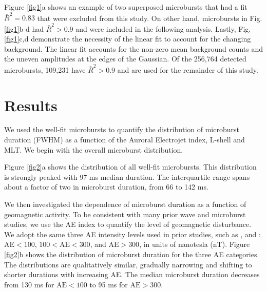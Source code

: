 \documentclass[draft]{agujournal2019}
\begin{document}
Figure \ref{fig1}a shows an example of two superposed microbursts that had a fit $\bar{R}^2 = 0.83$ that were excluded from this study. On other hand, microbursts in Fig. \ref{fig1}b-d had $\bar{R}^2 > 0.9$ and were included in the following analysis. Lastly, Fig. \ref{fig1}c,d demonstrate the necessity of the linear fit to account for the changing background. The linear fit accounts for the non-zero mean background counts and the uneven amplitudes at the edges of the Gaussian. Of the 256,764 detected microbursts, 109,231 have $\bar{R}^2 > 0.9$ and are used for the remainder of this study.

\section{Results}\label{results}
We used the well-fit microbursts to quantify the distribution of microburst duration (FWHM) as a function of the Auroral Electrojet index, L-shell and MLT. We begin with the overall microburst distribution.

Figure \ref{fig2}a shows the distribution of all well-fit microbursts. This distribution is strongly peaked with 97 ms median duration. The interquartile range spans about a factor of two in microburst duration, from 66 to 142 ms.

We then investigated the dependence of microburst duration as a function of geomagnetic activity. To be consistent with many prior wave and microburst studies, we use the AE index to quantify the level of geomagnetic disturbance. We adopt the same three AE intensity levels used in prior studies, such as , and : $\mathrm{AE} < 100$, $100 < \mathrm{AE} < 300$, and $\mathrm{AE} > 300$, in units of nanotesla (nT). Figure \ref{fig2}b shows the distribution of microburst duration for the three AE categories. The distributions are qualitatively similar, gradually narrowing and shifting to shorter durations with increasing AE. The median microburst duration decreases from 130 ms for $\mathrm{AE} < 100$ to 95 ms for $ \mathrm{AE} > 300$.
\end{document}
